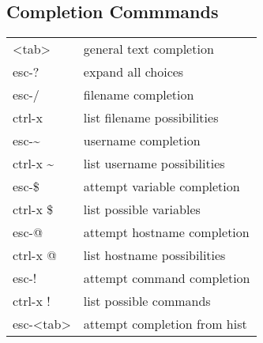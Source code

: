 \subsection*{Completion Commmands}
\begin{tabular}{l  l}
    <tab>       & general text completion \\
    esc-?       & expand all choices \\ 
    esc-/       & filename completion \\
    ctrl-x      & list filename possibilities \\
    esc-\textasciitilde     & username completion \\
    ctrl-x \textasciitilde  & list username possibilities \\
    esc-\$      & attempt variable completion \\
    ctrl-x \$   & list possible variables \\
    esc-@       & attempt hostname completion \\
    ctrl-x @    & list hostname possibilities \\
    esc-!       & attempt command completion \\
    ctrl-x !    & list possible commands \\
    esc-<tab>   & attempt completion from hist \\
\end{tabular}


